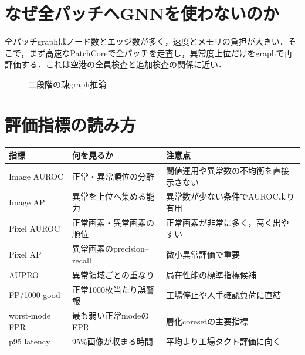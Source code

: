 \documentclass[a4paper,11pt]{ltjsarticle}
\begin{document}
\section{なぜ全パッチへGNNを使わないのか}
全パッチgraphはノード数とエッジ数が多く，速度とメモリの負担が大きい．そこで，まず高速なPatchCoreで全パッチを走査し，異常度上位だけをgraphで再評価する．これは空港の全員検査と追加検査の関係に近い．

\begin{figure}[H]
\centering
{}
\caption{二段階の疎graph推論}
\end{figure}

\section{評価指標の読み方}
\begin{longtable}{L{30mm}L{42mm}Y}
\toprule
指標 & 何を見るか & 注意点 \\
\midrule
Image AUROC & 正常・異常順位の分離 & 閾値運用や異常数の不均衡を直接示さない \\
Image AP & 異常を上位へ集める能力 & 異常数が少ない条件でAUROCより有用 \\
Pixel AUROC & 正常画素・異常画素の順位 & 正常画素が非常に多く，高く出やすい \\
Pixel AP & 異常画素のprecision--recall & 微小異常評価で重要 \\
AUPRO & 異常領域ごとの重なり & 局在性能の標準指標候補 \\
FP/1000 good & 正常1000枚当たり誤警報 & 工場停止や人手確認負荷に直結 \\
worst-mode FPR & 最も弱い正常modeのFPR & 層化coresetの主要指標 \\
p95 latency & 95\%画像が収まる時間 & 平均より工場タクト評価に向く \\
\bottomrule
\end{longtable}
\end{document}
